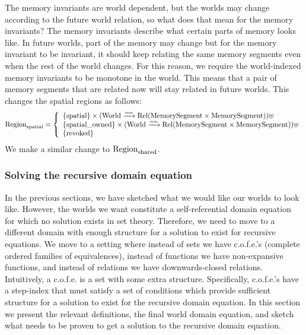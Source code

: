 \begin{jversion}
The memory invariants are world dependent, but the worlds may change according to the future world relation, so what does that mean for the memory invariants?
The memory invariants describe what certain parts of memory looks like.
In future worlds, part of the memory may change but for the memory invariant to be invariant, it should keep relating the same memory segments even when the rest of the world changes.
For this reason, we require the world-indexed memory invariants to be monotone in the world.
This means that a pair of memory segments that are related now will stay related in future worlds.
This changes the spatial regions as follows:
\[
  \mathrm{Region}_\mathrm{spatial} = \left\{
  \begin{array}{l}
    \{\mathrm{spatial} \} \times (\mathrm{World} \xrightarrow{\textit{\tiny{mon}}} \mathrm{Rel}(\mathrm{MemorySegment} \times \mathrm{MemorySegment})) \uplus \\
    \{\mathrm{spatial\_owned} \} \times (\mathrm{World} \xrightarrow{\textit{\tiny{mon}}} \mathrm{Rel}(\mathrm{MemorySegment} \times \mathrm{MemorySegment})) \uplus \\
    \{\mathrm{revoked} \}
  \end{array} \right.
\]
We make a similar change to $\mathrm{Region}_\mathrm{shared}$.

\subsubsection{Solving the recursive domain equation}
\label{subsubsec:rec-dom-eq}
%
In the previous sections, we have sketched what we would like our worlds to look like.
However, the worlds we want constitute a self-referential domain equation for which no solution exists in set theory.
Therefore, we need to move to a different domain with enough structure for a solution to exist for recursive equations.
We move to a setting where instead of sets we have c.o.f.e.'s (complete ordered families of equivalences), instead of functions we have non-expansive functions, and instead of relations we have downwards-closed relations.
Intuitively, a c.o.f.e. is a set with some extra structure.
Specifically, c.o.f.e.'s have a step-index that must satisfy a set of conditions which provide sufficient structure for a solution to exist for the recursive domain equation.
In this section we present the relevant definitions, the final world domain equation, and sketch what needs to be proven to get a solution to the recursive domain equation.


\end{jversion}

